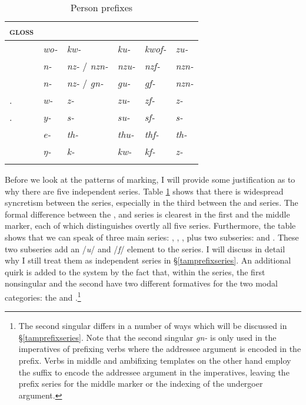 \begin{table}[H]
\caption{Person prefixes}
\label{perspref}
	\begin{tabular}{llllll}
		\lsptoprule
		\textsc{gloss} &\Alph &\Bet &\Betaone &\Betatwo &\Gam\\\hline
		\Fsg &\emph{wo-} &\emph{kw-} &\emph{ku-} &\emph{kwof-} &\emph{zu-}\\
		\Fnsg &\emph{n-} &\emph{nz-} / \emph{nzn-} &\emph{nzu-} &\emph{nzf-} &\emph{nzn-}\\
		\Ssg &\emph{n-}	&\emph{nz-} / \emph{gn-} &\emph{gu-} &\emph{gf-} &\emph{nzn-}\\
		\Tsg.\F &\emph{w-} &\emph{z-} &\emph{zu-} &\emph{zf-} &\emph{z-}\\
		\Tsg.\Masc &\emph{y-} &\emph{s-} &\emph{su-} &\emph{sf-} &\emph{s-}\\
		\Stnsg &\emph{e-} &\emph{th-} &\emph{thu-} &\emph{thf-} &\emph{th-}\\
		\M &\emph{ŋ-} &\emph{k-} &\emph{kw-} &\emph{kf-} &\emph{z-}\\
		\lspbottomrule
	\end{tabular}
\end{table}%

Before we look at the patterns of  marking, I will provide some justification as to why there are five independent series. Table \ref{perspref} shows that there is widespread syncretism between the series, especially in the third  between the \Bet{} and \Gam{} series. The formal difference between the \Alph, \Bet{} and \Gam{} series is clearest in the first   and the middle marker, each of which distinguishes overtly all five series. Furthermore, the table shows that we can speak of three main series: \Alph, \Bet, \Gam{}, plus two subseries: \Betaone{} and \Betatwo. These two subseries add an /\emph{u}/ and /\emph{f}/ element to the \Bet{} series. I will discuss in detail why I still treat them as independent series in \S{}\ref{tamprefixseries}. An additional quirk is added to the system by the fact that, within the \Bet{} series, the first nonsingular and the second  have two different formatives for the two modal categories: the  and .\footnote{The second singular differs in a number of ways which will be discussed in \S{}\ref{tamprefixseries}. Note that the second singular \emph{gn-} is only used in the imperatives of prefixing verbs where the addressee argument is encoded in the prefix. Verbs in middle and ambifixing templates on the other hand employ the suffix to encode the addressee argument in the imperatives, leaving the prefix \Bet{} series for the middle marker or the indexing of the undergoer argument.}\\

